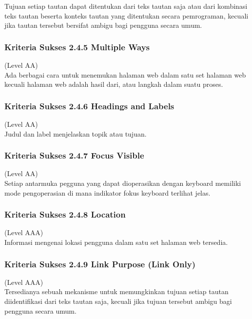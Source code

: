 Tujuan setiap tautan dapat ditentukan dari teks tautan saja atau dari kombinasi teks tautan beserta konteks tautan yang ditentukan secara pemrograman, kecuali jika tautan tersebut bersifat ambigu bagi pengguna secara umum.

\subsubsection{Kriteria Sukses 2.4.5 Multiple Ways}
\label{subsubsec:kriteria_2.4.5}
(Level AA) \\

Ada berbagai cara untuk menemukan halaman web dalam satu set halaman web kecuali halaman web adalah hasil dari, atau langkah dalam suatu proses.

\subsubsection{Kriteria Sukses 2.4.6 Headings and Labels}
\label{subsubsec:kriteria_2.4.6}
(Level AA) \\

Judul dan label menjelaskan topik atau tujuan.

\subsubsection{Kriteria Sukses 2.4.7 Focus Visible}
\label{subsubsec:kriteria_2.4.7}
(Level AA) \\

Setiap antarmuka pegguna yang dapat dioperasikan dengan keyboard memiliki mode pengoperasian di mana indikator fokus keyboard terlihat jelas.

\subsubsection{Kriteria Sukses 2.4.8 Location}
\label{subsubsec:kriteria_2.4.8}
(Level AAA) \\

Informasi mengenai lokasi pengguna dalam satu set halaman web tersedia.

\subsubsection{Kriteria Sukses 2.4.9 Link Purpose (Link Only)}
\label{subsubsec:kriteria_2.4.9}
(Level AAA) \\

Tersedianya sebuah mekanisme untuk memungkinkan tujuan setiap tautan diidentifikasi dari teks tautan saja, kecuali jika tujuan tersebut ambigu bagi pengguna secara umum.

